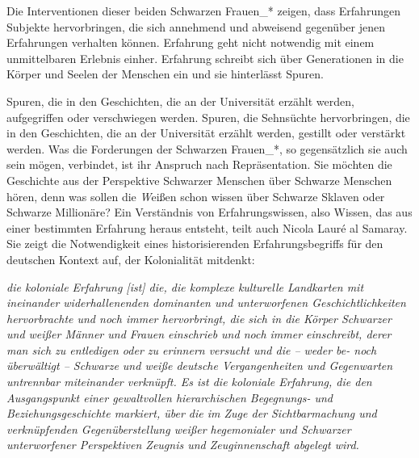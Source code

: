 Die Interventionen dieser beiden Schwarzen Frauen\_* zeigen, dass Erfahrungen
Subjekte hervorbringen, die sich annehmend und abweisend gegenüber jenen
Erfahrungen verhalten können. Erfahrung geht nicht notwendig mit einem
unmittelbaren Erlebnis einher. Erfahrung schreibt sich über Generationen in die
Körper und Seelen der Menschen ein und sie hinterlässt Spuren.

Spuren, die in den Geschichten, die an der Universität erzählt werden,
aufgegriffen oder verschwiegen werden. Spuren, die Sehnsüchte hervorbringen,
die in den Geschichten, die an der Universität erzählt werden, gestillt oder
verstärkt werden.
Was die Forderungen der Schwarzen Frauen\_*, so gegensätzlich
sie auch sein mögen, verbindet, ist ihr Anspruch nach Repräsentation. Sie
möchten die Geschichte aus der Perspektive Schwarzer Menschen über Schwarze
Menschen hören, denn was sollen die \textit{W}eißen schon wissen über Schwarze Sklaven
oder Schwarze Millionäre?  Ein Verständnis von Erfahrungswissen, also Wissen,
das aus einer bestimmten Erfahrung heraus entsteht, teilt auch Nicola Lauré al
Samaray. Sie zeigt die Notwendigkeit eines historisierenden Erfahrungsbegriffs
für den deutschen Kontext auf, der Kolonialität mitdenkt:

\begin{myenv}
  \textit{\glqq[…] die koloniale Erfahrung [ist] die, die komplexe kulturelle
    Landkarten mit ineinander widerhallenenden dominanten und unterworfenen
    Geschichtlichkeiten hervorbrachte und noch immer hervorbringt, die sich in
    die Körper Schwarzer und weißer Männer und Frauen einschrieb und noch immer
    einschreibt, derer man sich zu entledigen oder zu erinnern versucht und die
    – weder be- noch überwältigt – Schwarze und weiße deutsche Vergangenheiten
    und Gegenwarten untrennbar miteinander verknüpft. Es ist die koloniale
    Erfahrung, die den Ausgangspunkt einer gewaltvollen hierarchischen
    Begegnungs- und Beziehungsgeschichte markiert, über die im Zuge der
    Sichtbarmachung und verknüpfenden Gegenüberstellung weißer hegemonialer und
    Schwarzer unterworfener Perspektiven Zeugnis und Zeuginnenschaft abgelegt
  wird.\grqq\footnotemark{}} \end{myenv}

